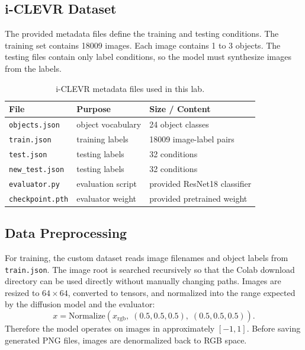 \documentclass[12pt,a4paper]{article}
\makeatletter
\newcommand{\NeedReportSpace}[1]{%
    \par
    \begingroup
    \dimen@=#1\relax
    \ifdim\dimexpr\pagegoal-\pagetotal\relax<\dimen@
        \pagebreak
    \fi
    \endgroup
}
\makeatother
\begin{document}
\subsection{i-CLEVR Dataset}

The provided metadata files define the training and testing conditions.  The
training set contains 18009 images.  Each image contains 1 to 3 objects.  The
testing files contain only label conditions, so the model must synthesize
images from the labels.

\NeedReportSpace{12\baselineskip}
\begin{table}[H]
    \centering
    \caption{i-CLEVR metadata files used in this lab.}
    \label{tab:dataset_files}
    \renewcommand{\arraystretch}{1.2}
    \begin{tabular}{lll}
    \toprule
    \textbf{File} & \textbf{Purpose} & \textbf{Size / Content} \\
    \midrule
    \texttt{objects.json} & object vocabulary & 24 object classes \\
    \texttt{train.json} & training labels & 18009 image-label pairs \\
    \texttt{test.json} & testing labels & 32 conditions \\
    \texttt{new\_test.json} & testing labels & 32 conditions \\
    \texttt{evaluator.py} & evaluation script & provided ResNet18 classifier \\
    \texttt{checkpoint.pth} & evaluator weight & provided pretrained weight \\
    \bottomrule
    \end{tabular}
\end{table}

\subsection{Data Preprocessing}

For training, the custom dataset reads image filenames and object labels from
\texttt{train.json}.  The image root is searched recursively so that the Colab
download directory can be used directly without manually changing paths.
Images are resized to $64 \times 64$, converted to tensors, and normalized into
the range expected by the diffusion model and the evaluator:
\[
    x = \mathrm{Normalize}(x_{\mathrm{rgb}},\; (0.5,0.5,0.5),\; (0.5,0.5,0.5)).
\]
Therefore the model operates on images in approximately $[-1,1]$.  Before
saving generated PNG files, images are denormalized back to RGB space.
\end{document}
